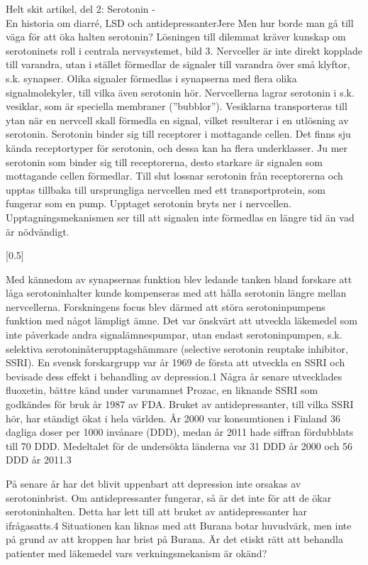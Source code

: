 \documentclass{spektraklet}
\begin{document}
\begin{artikel}{Helt skit artikel, del 2: Serotonin - \\ En historia om diarré, LSD och antidepressanter}{Jere}
Men hur borde man gå till väga för att öka halten serotonin? Lösningen till dilemmat kräver kunskap om serotoninets roll i centrala nervsystemet, bild 3. Nervceller är inte direkt kopplade till varandra, utan i stället förmedlar de signaler till varandra över små klyftor, s.k. synapser. Olika signaler förmedlas i synapserna med flera olika signalmolekyler, till vilka även serotonin hör. Nervcellerna lagrar serotonin i s.k. vesiklar, som är speciella membraner (”bubblor”). Vesiklarna transporteras till ytan när en nervcell skall förmedla en signal, vilket resulterar i en utlösning av serotonin. Serotonin binder sig till receptorer i mottagande cellen. Det finns sju kända receptortyper för serotonin, och dessa kan ha flera underklasser. Ju mer serotonin som binder sig till receptorerna, desto starkare är signalen som mottagande cellen förmedlar. Till slut lossnar serotonin från receptorerna och upptas tillbaka till ursprungliga nervcellen med ett transportprotein, som fungerar som en pump. Upptaget serotonin bryts ner i nervcellen. Upptagningsmekanismen ser till att signalen inte förmedlas en längre tid än vad är nödvändigt.

[0.5\columnwidth]


Med kännedom av synapsernas funktion blev ledande tanken bland forskare att låga serotoninhalter kunde kompenseras med att hålla serotonin längre mellan nervcellerna. Forskningens focus blev därmed att störa serotoninpumpens funktion med något lämpligt ämne. Det var önskvärt att utveckla läkemedel som inte påverkade andra signalämnespumpar, utan endast serotoninpumpen, s.k. selektiva serotoninåterupptagshämmare (selective serotonin reuptake inhibitor, SSRI). En svensk forskargrupp var år 1969 de första att utveckla en SSRI och bevisade dess effekt i behandling av depression.1 Några år senare utvecklades fluoxetin, bättre känd under varunamnet Prozac, en liknande SSRI som godkändes för bruk år 1987 av FDA. Bruket av antidepressanter, till vilka SSRI hör, har ständigt ökat i hela världen. År 2000 var konsumtionen i Finland 36 dagliga doser per 1000 invånare (DDD), medan år 2011 hade siffran fördubblats till 70 DDD. Medeltalet för de undersökta länderna var 31 DDD år 2000 och 56 DDD år 2011.3

På senare år har det blivit uppenbart att depression inte orsakas av serotoninbrist. Om antidepressanter fungerar, så är det inte för att de ökar serotoninhalten. Detta har lett till att bruket av antidepressanter har ifrågasatts.4 Situationen kan liknas med att Burana botar huvudvärk, men inte på grund av att kroppen har brist på Burana. Är det etiskt rätt att behandla patienter med läkemedel vars verkningsmekanism är okänd?


\end{artikel}
\end{document}

